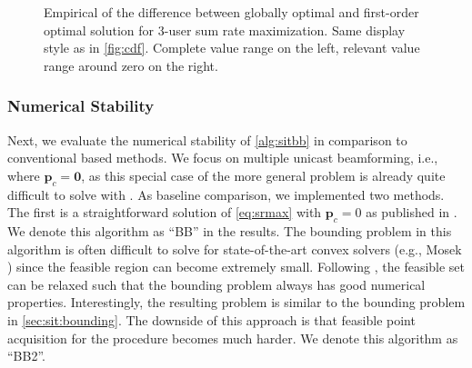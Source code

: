 \documentclass[a4paper,10pt,journal]{IEEEtran}
\let\vec\bm
\begin{document}
\begin{figure}%
	\centering
	\caption{Empirical  of the difference between globally optimal and first-order optimal solution for 3-user sum rate maximization. Same display style as in \cref{fig:cdf}. Complete value range on the left, relevant value range around zero on the right.}
	\label{fig:cdf3}
\end{figure}

\subsubsection{Numerical Stability}
Next, we evaluate the numerical stability of \cref{alg:sitbb} in comparison to conventional  based methods. We focus on multiple unicast beamforming, i.e., where $\vec p_c = \vec 0$, as this special case of the more general problem is already quite difficult to solve with .
As baseline comparison, we implemented two methods. The first is a straightforward  solution of \cref{eq:srmax} with $\vec p_c = 0$ as published in \cite{Bjornson2013,Tervo2015}. We denote this algorithm as ``BB'' in the results. The bounding problem in this algorithm is often difficult to solve for state-of-the-art convex solvers (e.g., Mosek \cite{mosek}) since the feasible region can become extremely small. Following \cite[\S 2.2.2]{Bjornson2013}, the feasible set can be relaxed such that the bounding problem always has good numerical properties. Interestingly, the resulting problem is similar to the  bounding problem in \cref{sec:sit:bounding}. The downside of this approach is that feasible point acquisition for the  procedure becomes much harder. We denote this algorithm as ``BB2''.
\end{document}
